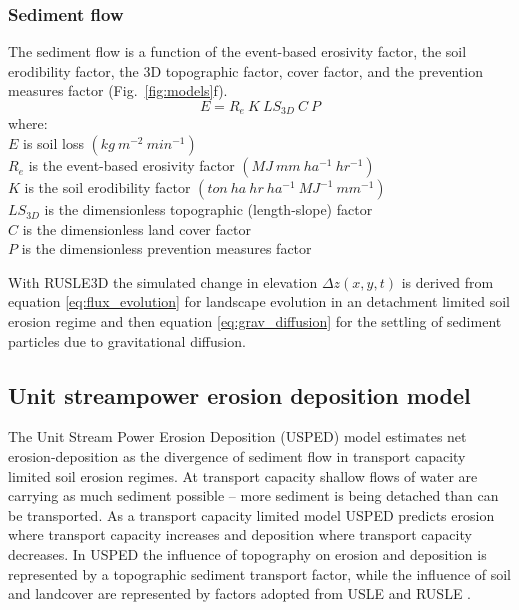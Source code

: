\documentclass[esurf, manuscript]{copernicus}
\begin{document}

\subsubsection{Sediment flow}

The sediment flow is a function of the event-based erosivity factor, 
the soil erodibility factor, the 3D topographic factor, cover factor, and the prevention measures factor 
(Fig.~\ref{fig:models}f).
%
\begin{equation}
\label{eq:rusle}
{E = R_e ~ K ~ LS_{3D} ~ C ~ P}
\end{equation}
%
{\small
\noindent
where: \\
\noindent
\hspace*{0.5em} $E$ is soil loss $(kg ~ m^{-2} ~ min^{-1})$\\
\hspace*{0.5em} $R_e$ is the event-based erosivity factor $(MJ ~ mm ~ ha^{-1} ~ hr^{-1})$\\ %
\hspace*{0.5em} $K$ is the soil erodibility factor $(ton ~ ha ~ hr ~ ha^{-1} ~ MJ^{-1} ~ mm^{-1})$\\
\hspace*{0.5em} $LS_{3D}$ is the dimensionless topographic (length-slope) factor\\
\hspace*{0.5em} $C$ is the dimensionless land cover factor\\
\hspace*{0.5em} $P$ is the dimensionless prevention measures factor\\
}

With RUSLE3D the simulated change in elevation $\Delta z(x,y,t)$
is derived from 
equation \ref{eq:flux_evolution}
for landscape evolution in an detachment limited soil erosion regime
and then equation \ref{eq:grav_diffusion}
for the settling of sediment particles due to gravitational diffusion.


\subsection{Unit streampower erosion deposition model} \label{usped_model}
The Unit Stream Power Erosion Deposition (USPED) model 
estimates net erosion-deposition as the divergence of sediment flow
in transport capacity limited soil erosion regimes.
At transport capacity 
shallow flows of water are carrying as much sediment possible 
-- more sediment is being detached 
than can be transported.
As a transport capacity limited model
USPED predicts erosion where transport capacity increases
and deposition where transport capacity decreases. 
In USPED the influence of topography on erosion and deposition
is represented by a topographic sediment transport factor,
while the influence of soil and landcover are represented by 
factors adopted from USLE and RUSLE
\citep{Mitasova1996}.
\end{document}
